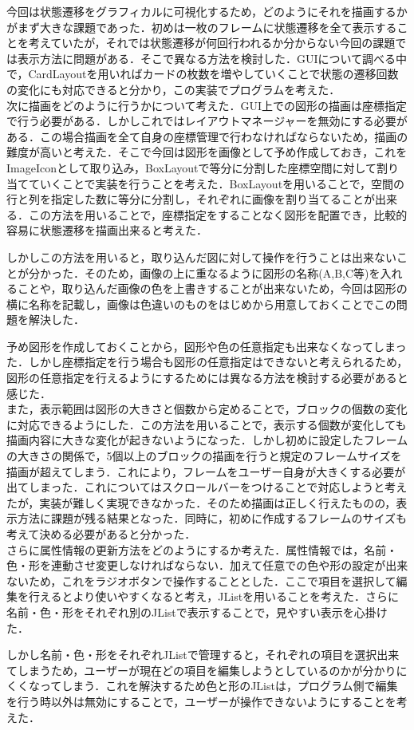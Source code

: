 \documentclass[uplatex,12pt]{jsarticle}
\begin{document}
今回は状態遷移をグラフィカルに可視化するため，どのようにそれを描画するかがまず大きな課題であった．初めは一枚のフレームに状態遷移を全て表示することを考えていたが，それでは状態遷移が何回行われるか分からない今回の課題では表示方法に問題がある．そこで異なる方法を検討した．GUIについて調べる中で，CardLayoutを用いればカードの枚数を増やしていくことで状態の遷移回数の変化にも対応できると分かり，この実装でプログラムを考えた．\\

次に描画をどのように行うかについて考えた．GUI上での図形の描画は座標指定で行う必要がある．しかしこれではレイアウトマネージャーを無効にする必要がある．この場合描画を全て自身の座標管理で行わなければならないため，描画の難度が高いと考えた．そこで今回は図形を画像として予め作成しておき，これをImageIconとして取り込み，BoxLayoutで等分に分割した座標空間に対して割り当てていくことで実装を行うことを考えた．BoxLayoutを用いることで，空間の行と列を指定した数に等分に分割し，それぞれに画像を割り当てることが出来る．この方法を用いることで，座標指定をすることなく図形を配置でき，比較的容易に状態遷移を描画出来ると考えた．\par
しかしこの方法を用いると，取り込んだ図に対して操作を行うことは出来ないことが分かった．そのため，画像の上に重なるように図形の名称(A,B,C等)を入れることや，取り込んだ画像の色を上書きすることが出来ないため，今回は図形の横に名称を記載し，画像は色違いのものをはじめから用意しておくことでこの問題を解決した．\par
予め図形を作成しておくことから，図形や色の任意指定も出来なくなってしまった．しかし座標指定を行う場合も図形の任意指定はできないと考えられるため，図形の任意指定を行えるようにするためには異なる方法を検討する必要があると感じた．\\

また，表示範囲は図形の大きさと個数から定めることで，ブロックの個数の変化に対応できるようにした．この方法を用いることで，表示する個数が変化しても描画内容に大きな変化が起きないようになった．しかし初めに設定したフレームの大きさの関係で，5個以上のブロックの描画を行うと規定のフレームサイズを描画が超えてしまう．これにより，フレームをユーザー自身が大きくする必要が出てしまった．これについてはスクロールバーをつけることで対応しようと考えたが，実装が難しく実現できなかった．そのため描画は正しく行えたものの，表示方法に課題が残る結果となった．同時に，初めに作成するフレームのサイズも考えて決める必要があると分かった．\\

さらに属性情報の更新方法をどのようにするか考えた．属性情報では，名前・色・形を連動させ変更しなければならない．加えて任意での色や形の設定が出来ないため，これをラジオボタンで操作することとした．ここで項目を選択して編集を行えるとより使いやすくなると考え，JListを用いることを考えた．さらに名前・色・形をそれぞれ別のJListで表示することで，見やすい表示を心掛けた．\par
しかし名前・色・形をそれぞれJListで管理すると，それぞれの項目を選択出来てしまうため，ユーザーが現在どの項目を編集しようとしているのかが分かりにくくなってしまう．これを解決するため色と形のJListは，プログラム側で編集を行う時以外は無効にすることで，ユーザーが操作できないようにすることを考えた．\\
\end{document}
